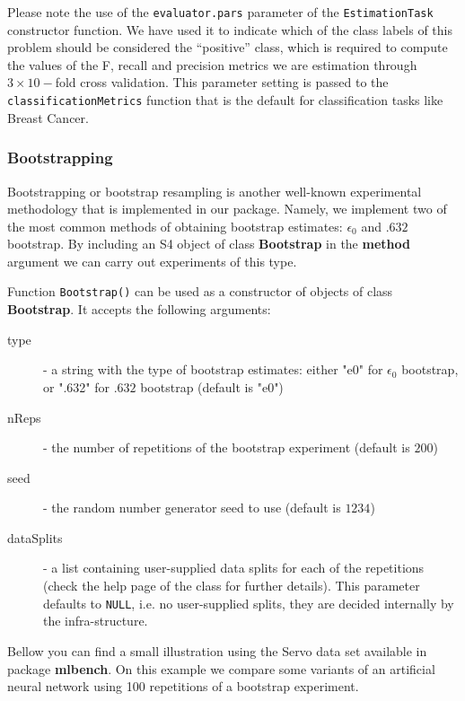 \documentclass[10pt,a4paper]{article}\usepackage[]{graphicx}\usepackage[]{color}
\begin{document}
Please note the use of the \texttt{evaluator.pars} parameter of the
\texttt{EstimationTask} constructor function. We have used it to indicate which of the class labels of this problem should be considered the ``positive'' class, which is required to compute the values of the F, recall and precision metrics we are estimation through $3\times 10-$fold cross validation. This parameter setting is passed to the \texttt{classificationMetrics} function that is the default for classification tasks like Breast Cancer.

\subsubsection{Bootstrapping}

Bootstrapping or bootstrap resampling is another well-known
experimental methodology that is implemented in our
package. Namely, we implement two of the most common methods of obtaining bootstrap estimates: $\epsilon_0$ and $.632$ bootstrap.
By including an S4 object of class
\textbf{Bootstrap} in the \textbf{method} argument we can carry out experiments of this
type.

Function \texttt{Bootstrap()} can be used as a constructor of
objects of class \textbf{Bootstrap}. It accepts the following
arguments:

\begin{description}
\item[type] - a string with the type of bootstrap estimates: either "e0" for $\epsilon_0$ bootstrap, or ".632" for $.632$ bootstrap (default is "e0")
\item[nReps] - the number of repetitions of the bootstrap experiment (default is $200$)
\item[seed] - the random number generator seed to use (default is $1234$)
\item[dataSplits] - a list containing user-supplied data splits
  for each of the repetitions (check the help page of the
  class for further details). This parameter defaults to
  \texttt{NULL}, i.e. no user-supplied splits, they are decided
  internally by the infra-structure.
\end{description}

Bellow you can find a small illustration using the Servo data set available in package \textbf{mlbench}. On this example we compare some variants of an artificial neural network using 100 repetitions of a bootstrap experiment. 
\end{document}
